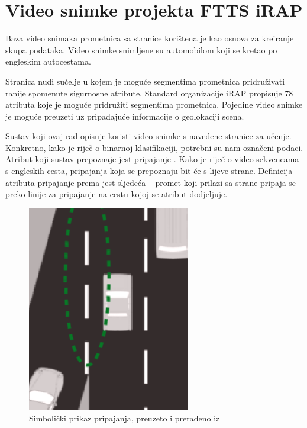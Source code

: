 \documentclass[times, utf8, diplomski, numeric]{fer}
\begin{document}
\section{Video snimke projekta FTTS iRAP}

Baza video snimaka prometnica sa stranice \citep{url:ftts_irap} korištena je kao osnova za kreiranje skupa podataka. 
Video snimke snimljene su automobilom koji se kretao po engleskim autocestama.

Stranica \citep{url:ftts_irap} nudi sučelje u kojem je moguće segmentima prometnica pridruživati ranije spomenute sigurnosne atribute. 
Standard organizacije iRAP propisuje 78 atributa \citep{man:ftts_irap_attributes} koje je moguće pridružiti segmentima prometnica.
Pojedine video snimke je moguće preuzeti uz pripadajuće informacije o geolokaciji scena.

Sustav koji ovaj rad opisuje koristi video snimke s navedene stranice za učenje. Konkretno, kako je riječ o binarnoj klasifikaciji, potrebni su nam označeni podaci. 
Atribut koji sustav prepoznaje jest pripajanje . Kako je riječ o video sekvencama s engleskih cesta, pripajanja koja se prepoznaju bit će s lijeve strane.
Definicija atributa pripajanje prema \citep{man:ftts_irap_coding_manual} jest sljedeća -- promet koji prilazi sa strane pripaja se preko linije za pripajanje na cestu kojoj se atribut dodjeljuje.

\begin{figure}[H]
\centering
\includegraphics[scale=0.75]{images/merge_lane.png}
\caption{Simbolički prikaz pripajanja, preuzeto i prerađeno iz \citep{man:ftts_irap_coding_manual}}
\label{img:merge_lane_symbolic}
\end{figure}
\end{document}
